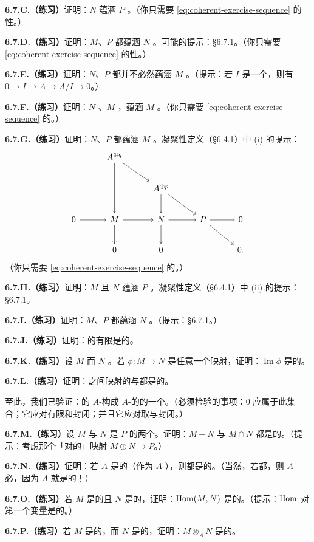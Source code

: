 \textbf{6.7.C.（练习）}\quad 证明：$N$ \trFinitelyGenerated{}蕴涵 $P$ \trFinitelyGenerated。（你只需要 \eqref{eq:coherent-exercise-sequence} 的\trRightExact{}性。）

\textbf{6.7.D.（练习）}\quad 证明：$M$、$P$ 都\trFinitelyGenerated{}蕴涵 $N$ \trFinitelyGenerated。可能的提示：\S6.7.1。（你只需要 \eqref{eq:coherent-exercise-sequence} 的\trRightExact{}性。）

\textbf{6.7.E.（练习）}\quad 证明：$N$、$P$ 都\trFinitelyGenerated{}并不必然蕴涵 $M$ \trFinitelyGenerated。（提示：若 $I$ 是一个\trIdeal，则有 $0\to I\to A\to A/I\to 0$。）

\textbf{6.7.F.（练习）}\quad 证明：$N$ \trCoh、$M$ \trFinitelyGenerated，蕴涵 $M$ \trCoh。（你只需要 \eqref{eq:coherent-exercise-sequence} 的\trLeftExactness。）

\textbf{6.7.G.（练习）}\quad 证明：$N$、$P$ 都\trCoh{}蕴涵 $M$ \trCoh。凝聚性定义（\S6.4.1）中 (i) 的提示：
\[
\begin{tikzcd}[row sep=2.2em, column sep=2.8em]
 & A^{\oplus q} \ar[dd] \ar[dr] & & \\
 & & A^{\oplus p} \ar[d] \ar[dr] & \\
0 \ar[r] & M \ar[r] \ar[d] & N \ar[r] \ar[d] & P \ar[r] \ar[dr] & 0 \\
 & 0 & 0 & & 0.
\end{tikzcd}
\]
（你只需要 \eqref{eq:coherent-exercise-sequence} 的\trLeftExactness。）

\textbf{6.7.H.（练习）}\quad 证明：$M$ \trFinitelyGenerated{}且 $N$ \trCoh{}蕴涵 $P$ \trCoh。凝聚性定义（\S6.4.1）中 (ii) 的提示：\S6.7.1。

\textbf{6.7.I.（练习）}\quad 证明：$M$、$P$ 都\trCoh{}蕴涵 $N$ \trCoh。（提示：\S6.7.1。）

\textbf{6.7.J.（练习）}\quad 证明：\trCoh{}\trModule{}的有限\trDirectSum{}是\trCoh{}的。

\textbf{6.7.K.（练习）}\quad 设 $M$ \trFinitelyGenerated{}而 $N$ \trCoh。若 $\phi\colon M\to N$ 是任意一个映射，证明：$\operatorname{Im}\phi$ 是\trCoh{}的。

\textbf{6.7.L.（练习）}\quad 证明：\trCoh{}\trModule{}之间映射的\trKernel{}与\trCokernel{}都是\trCoh{}的。

至此，我们已验证：\trCoh{}的 $A$-\trModule{}构成 $A$-\trModule{}的\trCategory{}的一个\trAbelian\trSubcategory。（必须检验的事项：$0$ 应属于此集合；它应对有限和封闭；并且它应对取\trKernel{}与\trCokernel{}封闭。）

\textbf{6.7.M.（练习）}\quad 设 $M$ 与 $N$ 是\trCoh{}\trModule{} $P$ 的两个\trCoh{}\trSubmodule。证明：$M+N$ 与 $M\cap N$ 都是\trCoh{}的。（提示：考虑那个「对的」映射 $M\oplus N\to P$。）

\textbf{6.7.N.（练习）}\quad 证明：若 $A$ 是\trCoh{}的（作为 $A$-\trModule），则\trFinitelyPresented{}\trModule{}都是\trCoh{}的。（当然，若\trFinitelyPresented{}\trModule{}都\trCoh，则 $A$ 必\trCoh，因为 $A$ 就是\trFinitelyPresented{}的！）

\textbf{6.7.O.（练习）}\quad 若 $M$ 是\trFinitelyPresented{}的且 $N$ 是\trCoh{}的，证明：$\operatorname{Hom}(M,N)$ 是\trCoh{}的。（提示：$\operatorname{Hom}$ 对第一个变量是\trLeftExact{}的。）

\textbf{6.7.P.（练习）}\quad 若 $M$ 是\trFinitelyPresented{}的，而 $N$ 是\trCoh{}的，证明：$M\otimes_A N$ 是\trCoh{}的。
